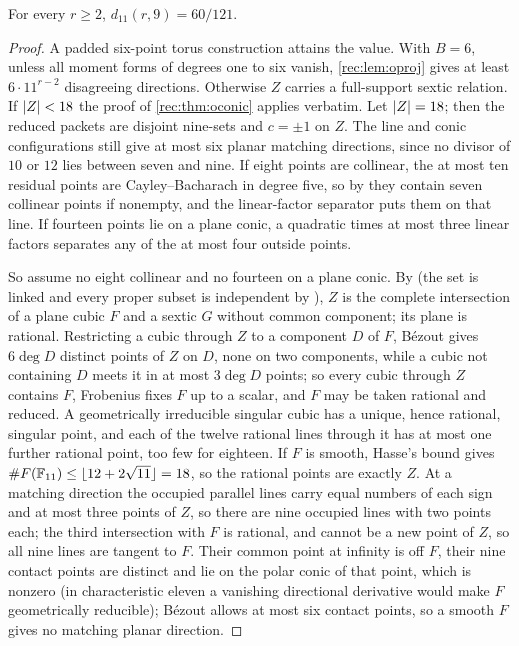 \begin{theorem}\label{rec:thm:oeleven}
For every $r\ge2$, $d_{11}(r,9)=60/121$.
\end{theorem}

\begin{proof}
A padded six-point torus construction attains the value. With $B=6$, unless all moment forms of degrees one
to six vanish, \cref{rec:lem:oproj} gives at least $6\cdot11^{r-2}$ disagreeing directions. Otherwise $Z$ carries a full-support
sextic relation. If $\lvert Z\rvert<18$ the proof of \cref{rec:thm:oconic} applies verbatim. Let $\lvert Z\rvert=18$; then the reduced
packets are disjoint nine-sets and $c=\pm1$ on $Z$. The line and conic configurations still give at most six
planar matching directions, since no divisor of $10$ or $12$ lies between seven and nine. If eight points are
collinear, the at most ten residual points are Cayley--Bacharach in degree five, so by
\cite[Proposition~7.3]{Couvreur2012Dual} they contain seven collinear points if nonempty, and the linear-factor separator
puts them on that line. If fourteen points lie on a plane conic, a quadratic times at most three linear
factors separates any of the at most four outside points.

So assume no eight collinear and no fourteen on a plane conic. By \cite[Theorem~3.8(iii), Proposition~9.1]{Couvreur2012Dual}
(the set is linked and every proper subset is independent by \cite[Proposition~8.2]{Couvreur2012Dual}), $Z$ is the complete
intersection of a plane cubic $F$ and a sextic $G$ without common component; its plane is rational. Restricting
a cubic through $Z$ to a component $D$ of $F$, B\'ezout gives $6\deg D$ distinct points of $Z$ on $D$, none on two
components, while a cubic not containing $D$ meets it in at most $3\deg D$ points; so every cubic through $Z$
contains $F$, Frobenius fixes $F$ up to a scalar, and $F$ may be taken rational and reduced. A geometrically
irreducible singular cubic has a unique, hence rational, singular point, and each of the twelve rational lines
through it has at most one further rational point, too few for eighteen. If $F$ is smooth, Hasse's bound gives
$\#F(\mathbb{F}_{11})\le\lfloor12+2\sqrt{11}\rfloor=18$, so the rational points are exactly $Z$. At a matching direction the occupied
parallel lines carry equal numbers of each sign and at most three points of $Z$, so there are nine occupied
lines with two points each; the third intersection with $F$ is rational, and cannot be a new point of $Z$, so
all nine lines are tangent to $F$. Their common point at infinity is off $F$, their nine contact points are
distinct and lie on the polar conic of that point, which is nonzero (in characteristic eleven a vanishing
directional derivative would make $F$ geometrically reducible); B\'ezout allows at most six contact points, so a
smooth $F$ gives no matching planar direction.


\end{proof}

